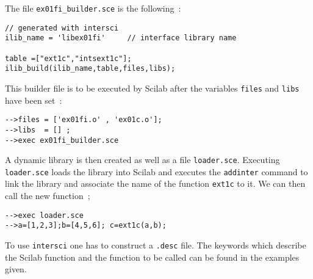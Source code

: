 The file \verb!ex01fi_builder.sce! is the following~:
\begin{verbatim}
// generated with intersci 
ilib_name = 'libex01fi'		// interface library name

table =["ext1c","intsext1c"];
ilib_build(ilib_name,table,files,libs);
\end{verbatim}

This  builder file is to be executed 
by Scilab after the variables \verb!files! and \verb!libs! have been set~:
\begin{verbatim}
-->files = ['ex01fi.o' , 'ex01c.o'];
-->libs  = [] ;
-->exec ex01fi_builder.sce
\end{verbatim}

\noindent
A dynamic library is then created as well as a file \verb!loader.sce!. 
Executing \verb!loader.sce! loads the library into Scilab and executes the
\verb!addinter! command to link the library and associate the name
of the function \verb!ext1c! to it. We can then call the new function~;
\begin{verbatim}
-->exec loader.sce
-->a=[1,2,3];b=[4,5,6]; c=ext1c(a,b);
\end{verbatim}

\noindent
To use \verb!intersci! one has to construct a \verb!.desc! file.
The keywords which describe the Scilab function and the function
to be called can be found in the examples given.


%



